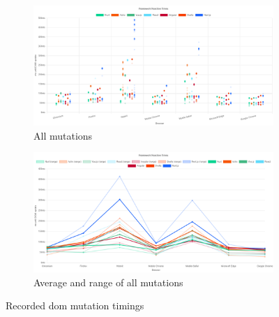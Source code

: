 \documentclass[a4paper, 10pt]{article}
\begin{document}
\begin{figure}[ht!]
  \centering
  \begin{subfigure}{0.9\linewidth}
    \begin{center}
      \includegraphics[width=\linewidth, keepaspectratio]{img/playwright-results/total.png}
    \end{center}
    \caption{All mutations}\label{subfig:PW:total}
  \end{subfigure}
  \begin{subfigure}{0.9\linewidth}
    \begin{center}
      \includegraphics[width=\linewidth, keepaspectratio]{img/playwright-results/totalAvg.png}
    \end{center}
    \caption{Average and range of all mutations}\label{subfig:PW:totalAvg}
  \end{subfigure}
  \caption{Recorded \acrshort{dom} mutation timings}
  \label{fig:playwrightResults:total}
\end{figure}
\end{document}
